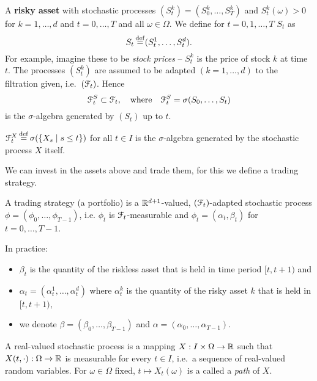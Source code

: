 \documentclass[12pt]{amsart}
\begin{document}
A \textbf{risky asset} with stochastic processes \((S_t^k) = (S_0^k, \dots, S_T^k)\) and \(S_t^k(\omega) > 0\) for \(k = 1, \dots, d\) and \(t = 0, \dots, T\) and all \(\omega \in \Omega\). We define for \(t=0, 1, \dots, T\) \(S_t\) as \[
    S_t \operatorname*{\stackrel{\operatorname{def}}{=}} (S_t^1, \dots, S^d_t).
\]
For example, imagine these to be \emph{stock prices} -- \(S_t^k\) is the price of stock \(k\) at time \(t\). The processes \((S_t^k)\) are assumed to be adapted \((k=1, \dots, d)\) to the filtration given, i.e.\ \((\mathcal{F}_t)\). Hence \[
    \mathcal{F}_t^S \subset \mathcal{F}_t, \quad\text{where}\quad \mathcal{F}_t^S = \sigma(S_0, \dots, S_t)
\]
is the \(\sigma\)-algebra generated by \((S_t)\) up to \(t\).

\begin{remark}[Repetition]
    \(\mathcal{F}_t^X \operatorname*{\stackrel{\operatorname{def}}{=}} \sigma(\left\{ X_s \mid s \leq t \right\})\) for all \(t \in I\) is the \(\sigma\)-algebra generated by the stochastic process \(X\) itself.
\end{remark}

We can invest in the assets above and trade them, for this we define a trading strategy.

\begin{definition}
    A trading strategy (a portfolio) is a \(\mathbb{R}^{d+1}\)-valued, \((\mathcal{F}_t)\)-adapted stochastic process \(\phi = (\phi_0, \dots, \phi_{T-1})\), i.e. \(\phi_t\) is \(\mathcal{F}_t\)-measurable and \(\phi_t = (\alpha_t, \beta_t)\) for \(t=0, \dots, T-1\).
\end{definition}
\begin{remark}
    In practice:
    \begin{itemize}
        \item \(\beta_t\) is the quantity of the riskless asset that is held in time period \([t, t+1)\) and
        \item \(\alpha_t = (\alpha_t^1, \dots, \alpha_t^d)\) where \(\alpha_t^k\) is the quantity of the risky asset \(k\) that is held in \([t, t+1)\),
        \item we denote \(\beta = (\beta_0, \dots, \beta_{T-1})\) and \(\alpha = (\alpha_0, \dots, \alpha_{T-1})\).
    \end{itemize}
\end{remark}
\begin{remark}[Repetition]
    A real-valued stochastic process is a mapping \(X: I \times \Omega \to \mathbb{R}\) such that \(X(t, \cdot): \Omega \to \mathbb{R}\) is measurable for every \(t \in I\), i.e.\ a sequence of real-valued random variables. For \(\omega \in \Omega\) fixed, \(t \mapsto X_t(\omega)\) is a called a \emph{path} of \(X\).
\end{remark}
\end{document}
